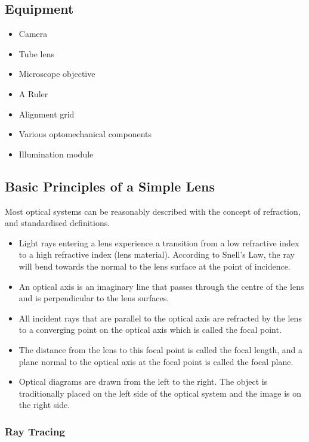 \documentclass[12pt,a4paper,twoside]{article}
\begin{document}
\subsection{Equipment}

\begin{itemize}
    \item Camera
    \item Tube lens
    \item Microscope objective
    \item A Ruler
    \item Alignment grid
    \item Various optomechanical components
    \item Illumination module
\end{itemize}

\subsection{Basic Principles of a Simple Lens}

Most optical systems can be reasonably described with the concept of refraction, and standardised definitions.

\begin{itemize}
    \item Light rays entering a lens experience a transition from a low refractive index to a high refractive index (lens material). According to Snell’s Law, the ray will bend towards the normal to the lens surface at the point of incidence.
    \item An optical axis is an imaginary line that passes through the centre of the lens and is perpendicular to the lens surfaces.
    \item All incident rays that are parallel to the optical axis are refracted by the lens to a converging point on the optical axis which is called the focal point.
    \item The distance from the lens to this focal point is called the focal length, and a plane normal to the optical axis at the focal point is called the focal plane.
    \item Optical diagrams are drawn from the left to the right. The object is traditionally placed on the left side of the optical system and the image is on the right side.
\end{itemize}

\subsubsection{Ray Tracing}
\end{document}

